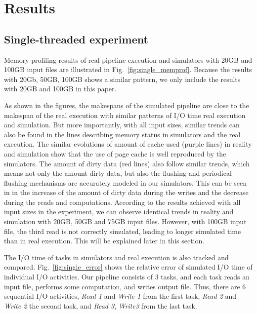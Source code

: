 \documentclass[conference]{IEEEtran}
\begin{document}
    \section{Results}
    \label{results}

        \subsection{Single-threaded experiment}

            Memory profiling results of real pipeline execution and simulators 
			with 20GB and 100GB input files are illustrated in Fig.~\ref{fig:single_memprof}.
			Because the results with 20Gb, 50GB, 100GB shows a similar pattern,
			we only include the results with 20GB and 100GB in this paper.

			As shown in the figures, the makespans of the simulated pipeline are
			close to the makespan of the real execution with similar patterns of I/O time
			real execution and simulation.
			But more importantly, with all input sizes, similar trends can also be found
			in the lines describing memory status in simulators and the real execution.
			The similar evolutions of amount of cache used (purple lines) in reality
			and simulation show that the use of page cache is well reproduced by the simulators.
			The amount of dirty data (red lines) also follow similar trends,
			which means not only the amount dirty data, but also the flushing and
			periodical flushing mechanisms are accurately modeled in our simulators.
			This can be seen in in the increase of the amount of dirty data during the writes
			and the decrease during the reads and computations.
			According to the results achieved with all input sizes in the experiment,
			we can observe identical trends in reality and simulation with 20GB,
			50GB and 75GB input files. However, with 100GB input file,
			the third read is not correctly simulated, leading to longer simulated time
			than in real execution. This will be explained later in this section.

			The I/O time of tasks in simulators and real execution is also tracked and compared.
			Fig.~\ref{fig:single_error} shows the relative error of simulated I/O time
			of individual I/O activities.
			Our pipeline consists of 3 tasks, and each task reads an input file,
			performs some computation, and writes output file.
			Thus, there are 6 sequential I/O activities, \textit{Read 1} and \textit{Write 1}
			from the first task, \textit{Read 2} and \textit{Write 2} the second task,
			and \textit{Read 3}, \textit{Write3} from the last task.
\end{document}
